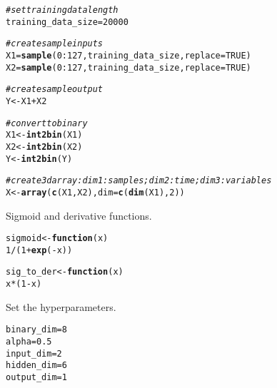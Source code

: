 \documentclass[english,article]{article}\usepackage[]{graphicx}\usepackage[]{color}
\makeatletter
\newcommand{\hlnum}[1]{\textcolor[rgb]{0.686,0.059,0.569}{#1}}%
\newcommand{\hlcom}[1]{\textcolor[rgb]{0.678,0.584,0.686}{\textit{#1}}}%
\newcommand{\hlopt}[1]{\textcolor[rgb]{0,0,0}{#1}}%
\newcommand{\hlstd}[1]{\textcolor[rgb]{0.345,0.345,0.345}{#1}}%
\newcommand{\hlkwa}[1]{\textcolor[rgb]{0.161,0.373,0.58}{\textbf{#1}}}%
\newcommand{\hlkwb}[1]{\textcolor[rgb]{0.69,0.353,0.396}{#1}}%
\newcommand{\hlkwc}[1]{\textcolor[rgb]{0.333,0.667,0.333}{#1}}%
\newcommand{\hlkwd}[1]{\textcolor[rgb]{0.737,0.353,0.396}{\textbf{#1}}}%
\newenvironment{kframe}{%
 \def\at@end@of@kframe{}%
 \ifinner\ifhmode%
  \def\at@end@of@kframe{\end{minipage}}%
  \begin{minipage}{\columnwidth}%
 \fi\fi%
 \def\FrameCommand##1{\hskip\@totalleftmargin \hskip-\fboxsep
 \colorbox{shadecolor}{##1}\hskip-\fboxsep
     \hskip-\linewidth \hskip-\@totalleftmargin \hskip\columnwidth}%
 \MakeFramed {\advance\hsize-\width
   \@totalleftmargin\z@ \linewidth\hsize
   \@setminipage}}%
 {\par\unskip\endMakeFramed%
 \at@end@of@kframe}
\newenvironment{knitrout}{}{} %
\makeatother
\begin{document}
\begin{knitrout}
\color{fgcolor}\begin{kframe}
\begin{alltt}
\hlcom{# set training data length}
\hlstd{training_data_size} \hlkwb{=} \hlnum{20000}

\hlcom{# create sample inputs }
\hlstd{X1} \hlkwb{=} \hlkwd{sample}\hlstd{(}\hlnum{0}\hlopt{:}\hlnum{127}\hlstd{, training_data_size,} \hlkwc{replace}\hlstd{=}\hlnum{TRUE}\hlstd{)}
\hlstd{X2} \hlkwb{=} \hlkwd{sample}\hlstd{(}\hlnum{0}\hlopt{:}\hlnum{127}\hlstd{, training_data_size,} \hlkwc{replace}\hlstd{=}\hlnum{TRUE}\hlstd{)}

\hlcom{# create sample output }
\hlstd{Y} \hlkwb{<-} \hlstd{X1} \hlopt{+} \hlstd{X2}

\hlcom{# convert to binary }
\hlstd{X1} \hlkwb{<-} \hlkwd{int2bin}\hlstd{(X1)}
\hlstd{X2} \hlkwb{<-} \hlkwd{int2bin}\hlstd{(X2)}
\hlstd{Y}  \hlkwb{<-} \hlkwd{int2bin}\hlstd{(Y)}

\hlcom{# create 3d array: dim 1: samples; dim 2: time; dim 3: variables }
\hlstd{X} \hlkwb{<-} \hlkwd{array}\hlstd{(} \hlkwd{c}\hlstd{(X1,X2),} \hlkwc{dim}\hlstd{=}\hlkwd{c}\hlstd{(}\hlkwd{dim}\hlstd{(X1),}\hlnum{2}\hlstd{) )}
\end{alltt}
\end{kframe}
\end{knitrout}

Sigmoid and derivative functions.

\begin{knitrout}
\color{fgcolor}\begin{kframe}
\begin{alltt}
\hlstd{sigmoid} \hlkwb{<-} \hlkwa{function}\hlstd{(}\hlkwc{x}\hlstd{)}
             \hlnum{1} \hlopt{/} \hlstd{(} \hlnum{1}\hlopt{+}\hlkwd{exp}\hlstd{(}\hlopt{-}\hlstd{x) )}

\hlstd{sig_to_der} \hlkwb{<-} \hlkwa{function}\hlstd{(}\hlkwc{x}\hlstd{)}
                \hlstd{x}\hlopt{*}\hlstd{(}\hlnum{1}\hlopt{-}\hlstd{x)}
\end{alltt}
\end{kframe}
\end{knitrout}

Set the hyperparameters.

\begin{knitrout}
\color{fgcolor}\begin{kframe}
\begin{alltt}
\hlstd{binary_dim} \hlkwb{=} \hlnum{8}
\hlstd{alpha}      \hlkwb{=} \hlnum{0.5}
\hlstd{input_dim}  \hlkwb{=} \hlnum{2}
\hlstd{hidden_dim} \hlkwb{=} \hlnum{6}
\hlstd{output_dim} \hlkwb{=} \hlnum{1}
\end{alltt}
\end{kframe}
\end{knitrout}
\end{document}
